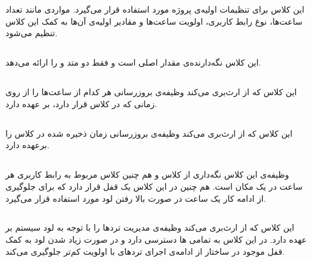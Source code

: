 \documentclass[oneside,a4paper,11pt]{report}
\begin{document}
	این کلاس برای تنظیمات اولیه‌ی پروژه مورد استفاده قرار می‌گیرد. مواردی مانند تعداد ساعت‌ها، نوع رابط کاربری، اولویت ساعت‌ها و مقادیر اولیه‌ی آن‌ها به کمک این کلاس تنظیم می‌شود.
	
	
	\subsection{}
	
	این کلاس نگه‌دارنده‌ی مقدار اصلی  است و فقط دو متد 
	و 
	را ارائه می‌دهد.
	
	\subsection{}
	
	
	این کلاس که از 
	ارث‌بری می‌کند وظیفه‌ی بروزرسانی هر کدام از ساعت‌ها را از روی زمانی که در کلاس 
	قرار دارد، بر عهده دارد.
	
	\subsection{}
	
	
	این کلاس که از 
	ارث‌بری می‌کند وظیفه‌ی بروزرسانی زمان ذخیره شده در کلاس 
	را برعهده دارد.
	
	\subsection{}
	وظیفه‌ی این کلاس نگه‌داری از کلاس 
	و هم چنین کلاس مربوط به رابط کاربری هر ساعت در یک مکان است. هم چنین در این کلاس یک قفل قرار دارد که برای جلوگیری از ادامه کار یک ساعت در صورت بالا رفتن لود 
	مورد استفاده قرار می‌گیرد.
	
	\subsection{}
	
	این کلاس که از 
	ارث‌بری می‌کند
	وظیفه‌‌ی مدیریت تردها را با توجه به لود سیستم بر عهده دارد. در این کلاس به تمامی
	ها دسترسی دارد و در صورت زیاد شدن لود
	به کمک قفل موجود در ساختار
	از ادامه‌ی اجرای تردهای با اولویت کم‌تر جلوگیری می‌کند.
	
	\subsection{}
	
\end{document}
